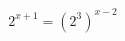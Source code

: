 \documentclass[preview]{standalone}
\begin{document}
\begin{align*}
2^{x+1} = (2^3)^{x-2}
\end{align*}
\end{document}
